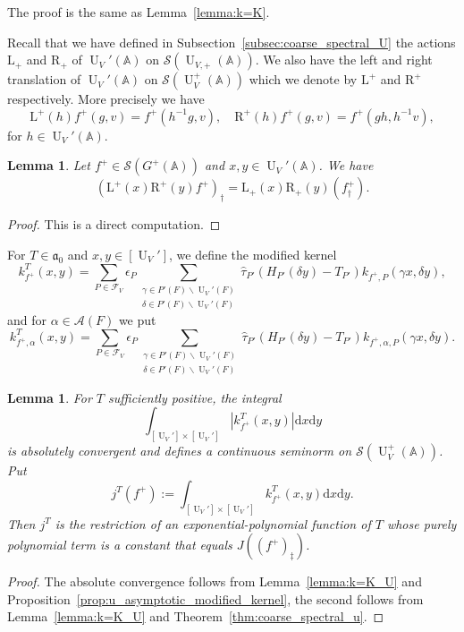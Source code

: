 \documentclass[letterpaper,11pt]{amsart}
\newcommand{\fa}{\mathfrak{a}}
\newcommand{\bA}{\mathbb{A}}
\newcommand{\cA}{\mathcal{A}}
\newcommand{\cF}{\mathcal{F}}
\newcommand{\cS}{\mathcal{S}}
\newcommand{\rd}{\mathrm{d}}
\newcommand{\<}{\negthickspace}
\providecommand{\Abs}[1]{\left\lvert#1\right\rvert}
\DeclareMathOperator{\U}{U}
\theoremstyle{definition}
\theoremstyle{plain}
\newtheorem{lemma}[definition]{Lemma}
\theoremstyle{remark}
\numberwithin{equation}{section}
\begin{document}
The proof is the same as Lemma~\ref{lemma:k=K}.

Recall that we have defined in Subsection~\ref{subsec:coarse_spectral_U} the
actions $\mathrm{L}_+$ and $\mathrm{R}_+$ of $\U_V'(\bA)$ on $\cS(\U_{V,
+}(\bA))$. We also have the left and right translation of $\U_V'(\bA)$ on
$\cS(\U_V^+(\bA))$ which we denote by
$\mathrm{L}^+$ and $\mathrm{R}^+$ respectively. More precisely we have
    \[
    \mathrm{L}^+(h) f^+(g, v) = f^+(h^{-1} g,  v), \quad
    \mathrm{R}^+(h) f^+(g, v) = f^+(gh, h^{-1} v),
    \]
for $h \in \U_V'(\bA)$.


\begin{lemma}   \label{lemma:FT_invariance_U}
Let $f^+ \in \cS(G^+(\bA))$ and $x, y \in \U_V'(\bA)$. We have
    \[
    (\mathrm{L}^+(x)\mathrm{R}^+(y) f^+)_{\dag} =
    \mathrm{L}_+(x)\mathrm{R}_+(y) (f^+_\dag) .
    \]
\end{lemma}

\begin{proof}
This is a direct computation.
\end{proof}


For $T \in \fa_0$ and $x, y \in [\U_V']$, we define the modified kernel
    \[
    k_{f^+}^T(x,y) =
    \sum_{P \in \cF_V} \epsilon_P
    \sum_{\substack{\gamma \in P'(F) \backslash \U_V'(F)
    \\
    \delta \in P'(F) \backslash \U_V'(F)}}
    \widehat{\tau}_{P'}(H_{P'}(\delta y)-T_{P'})
    k_{f^+,P}(\gamma x,\delta y),
    \]
and for $\alpha \in \cA(F)$ we put
    \[
     k_{f^+,\alpha}^T(x,y) =
    \sum_{P \in \cF_V} \epsilon_P
    \sum_{\substack{\gamma \in P'(F) \backslash \U_V'(F)
    \\
    \delta \in P'(F) \backslash \U_V'(F)}}
    \widehat{\tau}_{P'}(H_{P'}(\delta y)-T_{P'})
    k_{f^+, \alpha, P}(\gamma x, \delta y).
    \]


\begin{lemma}   \label{lem:integration_of_modified_kernel_seminorm_U}
For $T$ sufficiently positive, the integral
    \[
    \int_{[\U_V'] \times [\U_V']} \Abs{k_{f^+}^T(x,y)} \rd x \rd y
    \]
is absolutely convergent and defines a continuous seminorm on
$\cS(\U_V^+(\bA))$. Put
    \[
    j^T(f^+) := \int_{[\U_V'] \times [\U_V']} k_{f^+}^T(x,y) \rd x \rd y.
    \]
Then $j^T$ is the restriction of an exponential-polynomial function of $T$
whose  purely polynomial term is a constant that equals $J((f^+)_\ddag)$.
\end{lemma}


\begin{proof}
The absolute convergence follows from Lemma~\ref{lemma:k=K_U} and
Proposition~\ref{prop:u_asymptotic_modified_kernel}, the second follows from
Lemma~\ref{lemma:k=K_U} and Theorem~\ref{thm:coarse_spectral_u}.
\end{proof}
\end{document}
